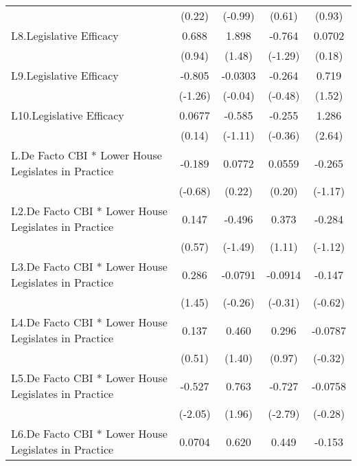 {\begin{longtable}{l*{4}{c}}
                &   (0.22)         &  (-0.99)         &   (0.61)         &   (0.93)         \\
[1em]
L8.Legislative Efficacy&    0.688         &    1.898         &   -0.764         &   0.0702         \\
                &   (0.94)         &   (1.48)         &  (-1.29)         &   (0.18)         \\
[1em]
L9.Legislative Efficacy&   -0.805         &  -0.0303         &   -0.264         &    0.719         \\
                &  (-1.26)         &  (-0.04)         &  (-0.48)         &   (1.52)         \\
[1em]
L10.Legislative Efficacy&   0.0677         &   -0.585         &   -0.255         &    1.286\sym{**} \\
                &   (0.14)         &  (-1.11)         &  (-0.36)         &   (2.64)         \\
[1em]
L.De Facto CBI * Lower House Legislates in Practice&   -0.189         &   0.0772         &   0.0559         &   -0.265         \\
                &  (-0.68)         &   (0.22)         &   (0.20)         &  (-1.17)         \\
[1em]
L2.De Facto CBI * Lower House Legislates in Practice&    0.147         &   -0.496         &    0.373         &   -0.284         \\
                &   (0.57)         &  (-1.49)         &   (1.11)         &  (-1.12)         \\
[1em]
L3.De Facto CBI * Lower House Legislates in Practice&    0.286         &  -0.0791         &  -0.0914         &   -0.147         \\
                &   (1.45)         &  (-0.26)         &  (-0.31)         &  (-0.62)         \\
[1em]
L4.De Facto CBI * Lower House Legislates in Practice&    0.137         &    0.460         &    0.296         &  -0.0787         \\
                &   (0.51)         &   (1.40)         &   (0.97)         &  (-0.32)         \\
[1em]
L5.De Facto CBI * Lower House Legislates in Practice&   -0.527\sym{*}  &    0.763         &   -0.727\sym{**} &  -0.0758         \\
                &  (-2.05)         &   (1.96)         &  (-2.79)         &  (-0.28)         \\
[1em]
L6.De Facto CBI * Lower House Legislates in Practice&   0.0704         &    0.620         &    0.449         &   -0.153         \\

\end{longtable}}
